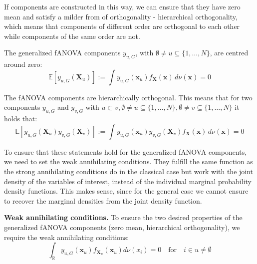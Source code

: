 If components are constructed in this way, we can ensure that they have zero mean and satisfy a milder from of orthogonality - hierarchical orthogonality, which means that components of different order are orthogonal to each other while components of the same order are not.
\begin{proposition}
    The generalized fANOVA components $y_{u, G}$, with $\emptyset \neq u \subseteq \{1, \ldots, N\}$, are centred around zero:
\begin{equation}
    \mathbb{E}[y_{u, G}(\boldsymbol{X}_u)] := \int y_{u, G}(\boldsymbol{x}_u) f_{\boldsymbol{X}}(\boldsymbol{x}) \, d\nu (\boldsymbol{x}) = 0
    \label{eq:zero_mean_g}
\end{equation}
\end{proposition}

\begin{proposition}
    The fANOVA components are hierarchically orthogonal. This means that for two components $y_{u, G}$ and $y_{v, G}$ with $u \subset v, \emptyset \neq u \subseteq \{1, \ldots, N\}, \emptyset \neq v \subseteq \{1, \ldots, N\} $ it holds that:
\begin{equation}
    \mathbb{E}[y_{u, G}(\boldsymbol{X}_u)y_{v, G}(\boldsymbol{X}_v)] := \int y_{u, G}(\boldsymbol{x}_u) y_{v, G}(\boldsymbol{X}_v) f_{\boldsymbol{X}}(\boldsymbol{x}) \, d\nu (\boldsymbol{x}) = 0
\end{equation}
\label{eq:orthogonality_g}
\end{proposition}

To ensure that these statements hold for the generalized fANOVA components, we need to set the weak annihilating conditions.
They fulfill the same function as the strong annihilating conditions do in the classical case but work with the joint density of the variables of interest, instead of the individual marginal probability density functions.
This makes sense, since for the general case we cannot ensure to recover the marginal densities from the joint density function. {\color{red}{Is this really the reason? Or is the reason: When there are dependencies between variables then the individual pdfs would not assign the ``correct weight'' as they ignore the dependence between features in $u$.}}
\begin{proposition}
    \textbf{Weak annihilating conditions.}
    To ensure the two desired properties of the generalized fANOVA components (zero mean, hierarchical orthogonality), we require the weak annihilating conditions:
\begin{equation}
    \int_{\mathbb{R}} y_{u, G}(\boldsymbol{x}_u) f_{\boldsymbol{X}_u}(\boldsymbol{x}_u) d\nu (x_i) = 0 \quad \text{for} \quad i \in u \neq \emptyset
\end{equation}
\end{proposition}

